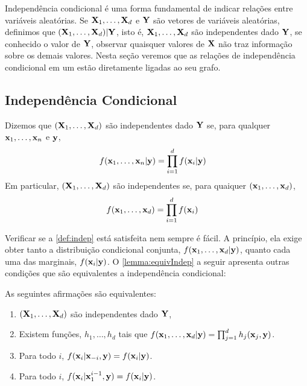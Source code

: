 Independência condicional é uma forma fundamental de
indicar relações entre variáveis aleatórias.
Se ${\mathbf{X}}_1,\ldots,{\mathbf{X}}_d$ e ${\mathbf{Y}}$ são vetores de variáveis aleatórias,
definimos que $({\mathbf{X}}_1,\ldots,{\mathbf{X}}_d) | {\mathbf{Y}}$, isto é,
${\mathbf{X}}_1,\ldots,{\mathbf{X}}_d$ são independentes dado ${\mathbf{Y}}$, se
conhecido o valor de ${\mathbf{Y}}$, 
observar quaisquer valores de ${\mathbf{X}}$ não traz 
informação sobre os demais valores.
Nesta seção veremos que 
as relações de independência condicional em um \CM
estão diretamente ligadas ao seu grafo.

\subsection{Independência Condicional}
\label{sec:indep}

\begin{definition}
 \label{def:indep}
 Dizemos que $({\mathbf{X}}_1,\ldots,{\mathbf{X}}_d)$ são independentes dado ${\mathbf{Y}}$ se,
 para qualquer ${\mathbf{x}}_1,\ldots,{\mathbf{x}}_n$ e ${\mathbf{y}}$,
 \begin{align*}
  f({\mathbf{x}}_1,\ldots,{\mathbf{x}}_n|{\mathbf{y}})	&= \prod_{i=1}^d f({\mathbf{x}}_i|{\mathbf{y}})
 \end{align*}
 Em particular, $({\mathbf{X}}_1,\ldots,{\mathbf{X}}_d)$ são independentes se,
 para quaiquer $({\mathbf{x}}_1,\ldots,{\mathbf{x}}_d)$,
 \begin{align*}
  f({\mathbf{x}}_1,\ldots,{\mathbf{x}}_d)	&= \prod_{i=1}^d f({\mathbf{x}}_i)
 \end{align*}
\end{definition}

Verificar se a \cref{def:indep} está satisfeita nem sempre é fácil.
A princípio, ela exige obter tanto a distribuição condicional conjunta, 
$f({\mathbf{x}}_1,\ldots,{\mathbf{x}}_d|{\mathbf{y}})$, quanto cada uma das marginais, $f({\mathbf{x}}_i|{\mathbf{y}})$.
O \cref{lemma:equivIndep} a seguir apresenta outras condições que
são equivalentes a independência condicional:

\begin{lemma}
 \label{lemma:equivIndep}
 As seguintes afirmações são equivalentes:
 \begin{enumerate}
  \item $({\mathbf{X}}_1,\ldots,{\mathbf{X}}_d)$ são independentes dado ${\mathbf{Y}}$,
  \item Existem funções, $h_1,\ldots,h_d$ tais que
  $f({\mathbf{x}}_1,\ldots,{\mathbf{x}}_d|{\mathbf{y}}) = \prod_{j=1}^{d}{h_j({\mathbf{x}}_j,{\mathbf{y}})}$.	
	\item Para todo $i$, 
	$f({\mathbf{x}}_i|{\mathbf{x}}_{-i},{\mathbf{y}}) = f({\mathbf{x}}_i|{\mathbf{y}})$.
	\item Para todo $i$,
	$f({\mathbf{x}}_i|{\mathbf{x}}_1^{i-1},{\mathbf{y}}) = f({\mathbf{x}}_i|{\mathbf{y}})$.
 \end{enumerate}
\end{lemma}

